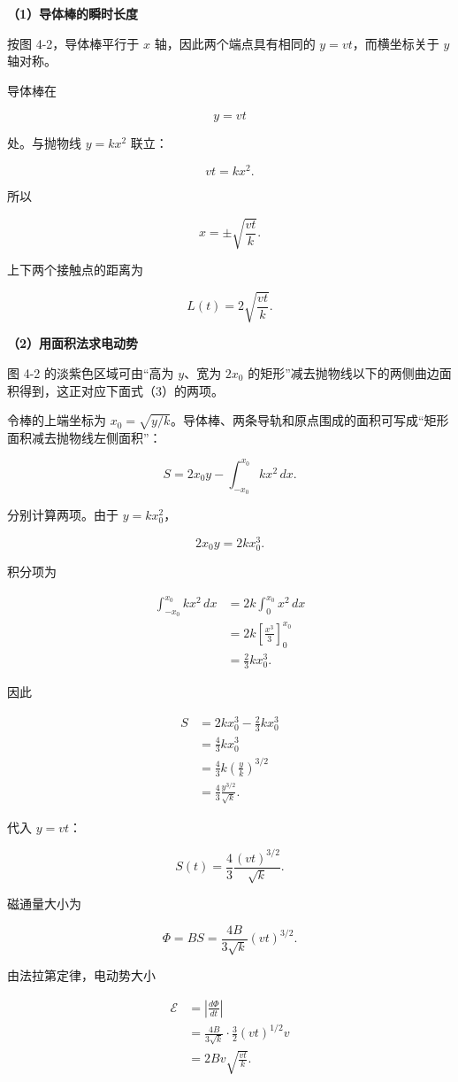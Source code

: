\documentclass[12pt,a4paper,UTF8]{ctexart}
\begin{document}
\textbf{（1）导体棒的瞬时长度}

按图 4-2，导体棒平行于 \(x\) 轴，因此两个端点具有相同的
\(y=vt\)，而横坐标关于 \(y\) 轴对称。

导体棒在

\[
y=vt
\tag{1}
\]

处。与抛物线 \(y=kx^2\) 联立：

\[
vt=kx^2.
\]

所以

\[
x=\pm\sqrt{\frac{vt}{k}}.
\]

上下两个接触点的距离为

\[
\boxed{L(t)=2\sqrt{\frac{vt}{k}}}.
\tag{2}
\]

\textbf{（2）用面积法求电动势}

图 4-2 的淡紫色区域可由``高为 \(y\)、宽为 \(2x_0\)
的矩形''减去抛物线以下的两侧曲边面积得到，这正对应下面式（3）的两项。

令棒的上端坐标为
\(x_0=\sqrt{y/k}\)。导体棒、两条导轨和原点围成的面积可写成``矩形面积减去抛物线左侧面积''：

\[
S=2x_0y-\int_{-x_0}^{x_0}kx^2\,dx.
\tag{3}
\]

分别计算两项。由于 \(y=kx_0^2\)，

\[
2x_0y=2kx_0^3.
\]

积分项为

\[
\begin{aligned}
\int_{-x_0}^{x_0}kx^2\,dx
&=2k\int_0^{x_0}x^2\,dx\\
&=2k\left[\frac{x^3}{3}\right]_0^{x_0}\\
&=\frac23kx_0^3.
\end{aligned}
\]

因此

\[
\begin{aligned}
S
&=2kx_0^3-\frac23kx_0^3\\
&=\frac43kx_0^3\\
&=\frac43k\left(\frac yk\right)^{3/2}\\
&=\frac43\frac{y^{3/2}}{\sqrt k}.
\end{aligned}
\tag{4}
\]

代入 \(y=vt\)：

\[
S(t)=\frac43\frac{(vt)^{3/2}}{\sqrt k}.
\tag{5}
\]

磁通量大小为

\[
\Phi=B S=\frac{4B}{3\sqrt k}(vt)^{3/2}.
\]

由法拉第定律，电动势大小

\[
\begin{aligned}
\mathcal E
&=\left|\frac{d\Phi}{dt}\right|\\
&=\frac{4B}{3\sqrt k}\cdot\frac32(vt)^{1/2}v\\
&=2Bv\sqrt{\frac{vt}{k}}.
\end{aligned}
\]
\end{document}
